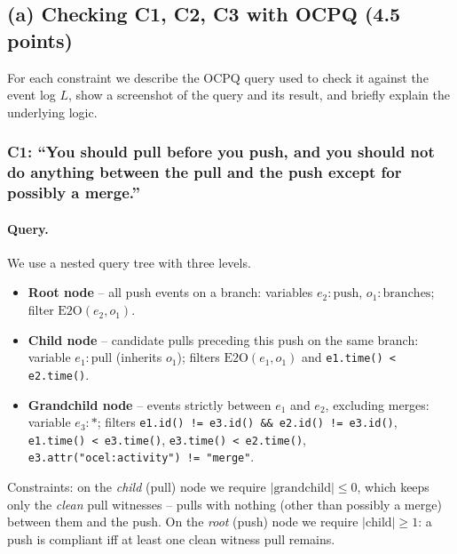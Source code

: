 \documentclass[11pt,a4paper]{article}
\begin{document}

\subsection*{(a) Checking C1, C2, C3 with OCPQ (4.5 points)}

For each constraint we describe the OCPQ query used to check it against the event log $L$,
show a screenshot of the query and its result, and briefly explain the underlying logic.

\subsubsection*{C1: ``You should pull before you push, and you should not do anything
      between the pull and the push except for possibly a merge.''}

\paragraph{Query.} We use a nested query tree with three levels.

\begin{itemize}
      \item \textbf{Root node} -- all push events on a branch:
            variables $e_2 : \text{push}$, $o_1 : \text{branches}$;
            filter $\mathrm{E2O}(e_2, o_1)$.
      \item \textbf{Child node} -- candidate pulls preceding this push on the same branch:
            variable $e_1 : \text{pull}$ (inherits $o_1$);
            filters $\mathrm{E2O}(e_1, o_1)$ and \texttt{e1.time() < e2.time()}.
      \item \textbf{Grandchild node} -- events strictly between $e_1$ and $e_2$, excluding merges:
            variable $e_3 : *$;
            filters
            \texttt{e1.id() != e3.id() \&\& e2.id() != e3.id()},
            \texttt{e1.time() < e3.time()},
            \texttt{e3.time() < e2.time()},
            \texttt{e3.attr("ocel:activity") != "merge"}.
\end{itemize}

Constraints: on the \emph{child} (pull) node we require $|\text{grandchild}| \le 0$, which keeps
only the \emph{clean} pull witnesses -- pulls with nothing (other than possibly a merge) between
them and the push. On the \emph{root} (push) node we require $|\text{child}| \ge 1$: a push is
compliant iff at least one clean witness pull remains.
\end{document}

